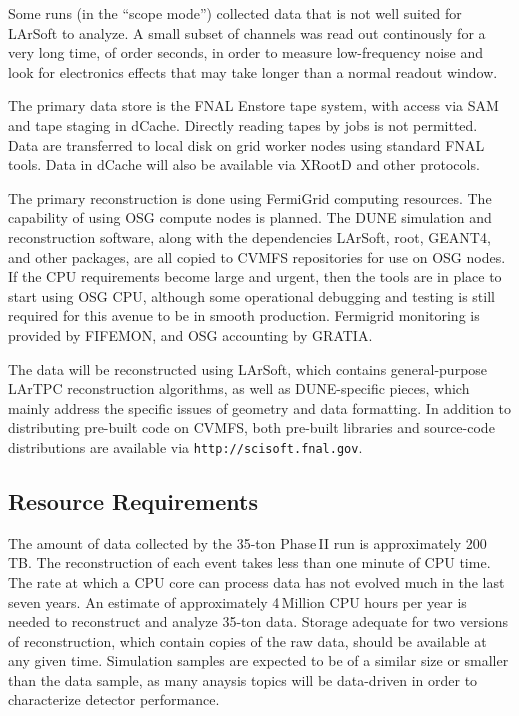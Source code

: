 Some runs (in the ``scope mode'') collected data that is not well suited for LArSoft to analyze.  A small subset
of channels was read out continously for a very long time, of order seconds, in order to measure
low-frequency noise and look for electronics effects that may take longer than a normal readout window.

The primary data store is the  FNAL Enstore tape system, with access via SAM and tape staging in
dCache.  Directly reading tapes by jobs is not permitted.  Data are transferred to local disk on grid
worker nodes using standard FNAL tools.  Data in dCache will also be available via XRootD and other protocols.

The primary reconstruction is done using FermiGrid computing resources.  The capability
of using OSG compute nodes is planned.  The DUNE simulation and reconstruction software, along with the
dependencies LArSoft, root, GEANT4, and other packages, are all copied to CVMFS repositories for use on
OSG nodes.  If the CPU requirements become large and urgent, then the tools are in place to start using
OSG CPU, although some operational debugging and testing is still required for this avenue to be in smooth
production.  Fermigrid monitoring is provided by FIFEMON, and OSG accounting by GRATIA.

The data will be reconstructed using LArSoft, which contains general-purpose LArTPC reconstruction algorithms,
as well as DUNE-specific pieces, which mainly address the specific issues of geometry and data formatting.
In addition to distributing pre-built code on CVMFS, both pre-built libraries and source-code distributions
are available via {\tt http://scisoft.fnal.gov}.


\subsection{Resource Requirements}
\label{sec:35t-resource-requirements}
The amount of data collected by the 35-ton Phase\,II run is approximately 200\,TB. 
The reconstruction of each event takes less than one minute of CPU time.  The rate at which
a CPU core can process data has not evolved much in the last seven years.  An estimate of approximately
4\,Million CPU hours per year is needed to reconstruct and analyze 35-ton data.  Storage adequate for
two versions of reconstruction, which contain copies of the raw data, should be available at any given time.
Simulation samples are expected to be of a similar size or smaller than the data sample, as many anaysis
topics will be data-driven in order to characterize detector performance.
